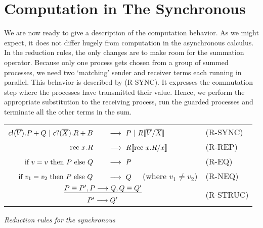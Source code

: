 \section{Computation in The Synchronous \Picalc}
We are now ready to give a description of the computation behavior.  
As we might expect, it does not differ hugely from computation in the asynchronous calculus.  
In the reduction rules, the only changes are to make room for the summation operator.
Because only one process gets chosen from a group of summed processes, we need two `matching' sender and receiver terms each running in parallel.  This behavior is described by (R-SYNC).  
It expresses the commutation step where the processes have transmitted their value.  Hence, we perform the appropriate substitution to the receiving process, run the guarded processes and terminate all the other terms in the sum.
\begin{insettable}
\begin{center}\begin{tabular}{rll}
	${c}!\langle{ \ensuremath{\overline{V}} }\rangle. P + Q \ |\  {c}?({\overline{X}}).R + B$\ &\  $\longrightarrow\  P \ |\  R\llbracket{ \ensuremath{\overline{V}} }/{\overline{X}}\rrbracket$ & \tiny{(R-SYNC)}\\
	$\text{rec }{x}.R$\ &\  $\longrightarrow\  R\llbracket{ \ensuremath{\text{rec }{x}.} R}/{x}\rrbracket$ & \tiny{(R-REP)}\\
	$\text{if } {v = v}\text{ then } P \text{ else } Q$\ &\ $\pred\ P$ & \tiny{(R-EQ)}\\
	$\text{if } {v_1 = v_2}\text{ then } P \text{ else } Q$\ &\ $\pred\ Q$ \ \ (where $v_1\neq v_2$)& \tiny{(R-NEQ)}\\
	\multicolumn{2}{c}{\hspace{4.5em}$\underline{P\equiv P', P \longrightarrow Q, Q\equiv Q'}$} & \multirow{2}{*}{\tiny{(R-STRUC)}}\\
	\multicolumn{2}{c}{\hspace{4.5em}$P'\longrightarrow Q'$}
\end{tabular}
\caption{\emph{Reduction rules for the synchronous \picalc}}\label{spireducs}
\end{center}
\end{insettable}


